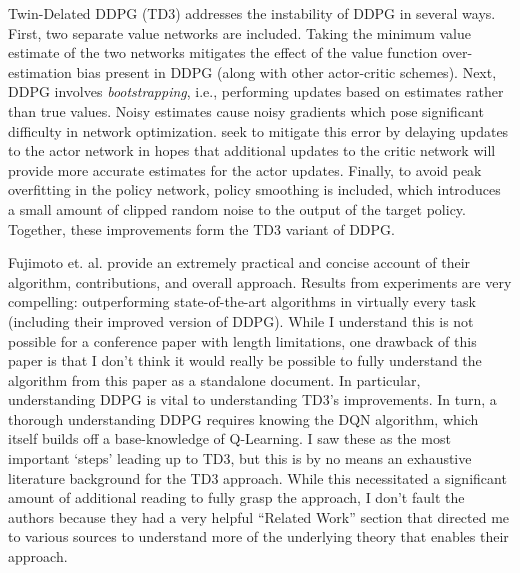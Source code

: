 \documentclass{article}
\begin{document}
Twin-Delated DDPG (TD3) addresses the instability of DDPG in several ways. First, two separate value networks are included. Taking the minimum value estimate of the two networks mitigates the effect of the value function over-estimation bias present in DDPG (along with other actor-critic schemes). Next, DDPG involves \textit{bootstrapping}, i.e., performing updates based on estimates rather than true values. Noisy estimates cause noisy gradients which pose significant difficulty in network optimization. \cite{td3} seek to mitigate this error by delaying updates to the actor network in hopes that additional updates to the critic network will provide more accurate estimates for the actor updates. Finally, to avoid peak overfitting in the policy network, policy smoothing is included, which introduces a small amount of clipped random noise to the output of the target policy. Together, these improvements form the TD3 variant of DDPG.

Fujimoto et. al. provide an extremely practical and concise account of their algorithm, contributions, and overall approach. Results from experiments are very compelling: outperforming state-of-the-art algorithms in virtually every task (including their improved version of DDPG). While I understand this is not possible for a conference paper with length limitations, one drawback of this paper is that I don't think it would really be possible to fully understand the algorithm from this paper as a standalone document. In particular, understanding DDPG is vital to understanding TD3's improvements. In turn, a thorough understanding DDPG requires knowing the DQN algorithm, which itself builds off a base-knowledge of Q-Learning. I saw these as the most important `steps' leading up to TD3, but this is by no means an exhaustive literature background for the TD3 approach. While this necessitated a significant amount of additional reading to fully grasp the approach, I don't fault the authors because they had a very helpful ``Related Work'' section that directed me to various sources to understand more of the underlying theory that enables their approach.
\end{document}
